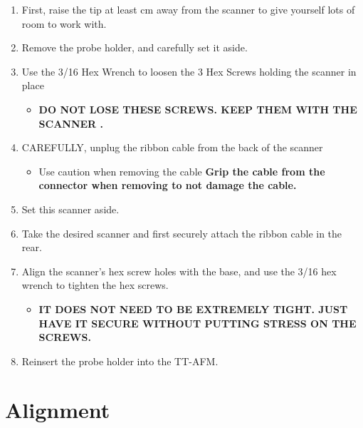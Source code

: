 \documentclass{../lab}
\begin{document}
\begin{enumerate}
    \item First, raise the tip at least cm away from the scanner to give yourself lots of room to work with.

    \item Remove the probe holder, and carefully set it aside.

    \item Use the 3/16 Hex Wrench to loosen the 3 Hex Screws holding the scanner in place

    \begin{itemize}
        \item \textbf{DO NOT LOSE THESE SCREWS. KEEP THEM WITH THE SCANNER .}
    \end{itemize}

    \item CAREFULLY, unplug the ribbon cable from the back of the scanner

    \begin{itemize}
        \item Use caution when removing the cable \textbf{Grip the cable from the connector when removing to not damage the cable.}
    \end{itemize}

    \item Set this scanner aside.

    \item Take the desired scanner and first securely attach the ribbon cable in the rear.

    \item Align the scanner's hex screw holes with the base, and use the 3/16 hex wrench to tighten the hex screws.

    \begin{itemize}
        \item \textbf{IT DOES NOT NEED TO BE EXTREMELY TIGHT. JUST HAVE IT SECURE WITHOUT PUTTING STRESS ON THE SCREWS.}
    \end{itemize}

    \item Reinsert the probe holder into the TT-AFM.

\end{enumerate}

\section{Alignment}
\label{sec:Alignment}
\end{document}
